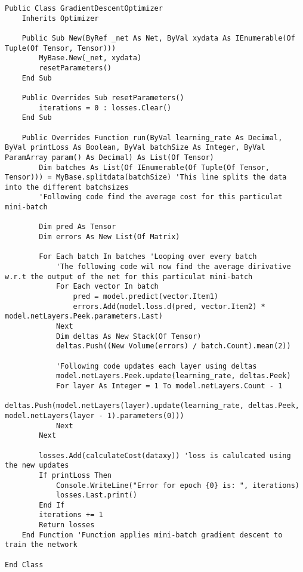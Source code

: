 \begin{verbatim}
Public Class GradientDescentOptimizer
    Inherits Optimizer

    Public Sub New(ByRef _net As Net, ByVal xydata As IEnumerable(Of Tuple(Of Tensor, Tensor)))
        MyBase.New(_net, xydata)
        resetParameters()
    End Sub

    Public Overrides Sub resetParameters()
        iterations = 0 : losses.Clear()
    End Sub

    Public Overrides Function run(ByVal learning_rate As Decimal, ByVal printLoss As Boolean, ByVal batchSize As Integer, ByVal ParamArray param() As Decimal) As List(Of Tensor)
        Dim batches As List(Of IEnumerable(Of Tuple(Of Tensor, Tensor))) = MyBase.splitdata(batchSize) 'This line splits the data into the different batchsizes
        'Following code find the average cost for this particulat mini-batch 

        Dim pred As Tensor
        Dim errors As New List(Of Matrix)

        For Each batch In batches 'Looping over every batch
            'The following code wil now find the average dirivative w.r.t the output of the net for this particulat mini-batch
            For Each vector In batch
                pred = model.predict(vector.Item1)
                errors.Add(model.loss.d(pred, vector.Item2) * model.netLayers.Peek.parameters.Last)
            Next
            Dim deltas As New Stack(Of Tensor)
            deltas.Push((New Volume(errors) / batch.Count).mean(2))

            'Following code updates each layer using deltas
            model.netLayers.Peek.update(learning_rate, deltas.Peek)
            For layer As Integer = 1 To model.netLayers.Count - 1
                deltas.Push(model.netLayers(layer).update(learning_rate, deltas.Peek, model.netLayers(layer - 1).parameters(0)))
            Next
        Next

        losses.Add(calculateCost(dataxy)) 'loss is calulcated using the new updates
        If printLoss Then
            Console.WriteLine("Error for epoch {0} is: ", iterations)
            losses.Last.print()
        End If
        iterations += 1
        Return losses
    End Function 'Function applies mini-batch gradient descent to train the network

End Class
\end{verbatim}
